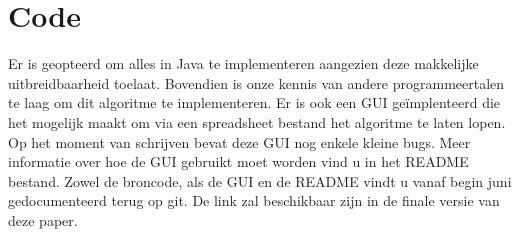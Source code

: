 \documentclass[Main.tex]{subfiles}
\begin{document}
\section{Code}
Er is geopteerd om alles in Java te implementeren aangezien deze makkelijke uitbreidbaarheid toelaat. Bovendien is onze kennis van andere programmeertalen te laag om dit algoritme te implementeren. Er is ook een GUI ge\"implenteerd die het mogelijk maakt om via een spreadsheet bestand het algoritme te laten lopen. Op het moment van schrijven bevat deze GUI nog enkele kleine bugs. Meer informatie over hoe de GUI gebruikt moet worden vind u in het README bestand. Zowel de broncode, als de GUI en de README vindt u vanaf begin juni gedocumenteerd terug op git. De link zal beschikbaar zijn in de finale versie van deze paper.
\end{document}
